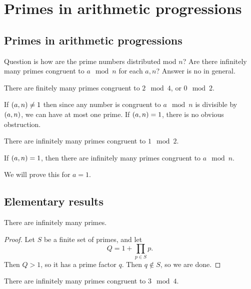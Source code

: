 \pagebreak

\section{Primes in arithmetic progressions}

\subsection{Primes in arithmetic progressions}

Question is how are the prime numbers distributed mod $ n $? Are there infinitely many primes congruent to $ a \mod n $ for each $ a, n $? Answer is no in general.

\begin{example*}
There are finitely many primes congruent to $ 2 \mod 4 $, or $ 0 \mod 2 $.
\end{example*}

If $ \left( a, n \right) \ne 1 $ then since any number is congruent to $ a \mod n $ is divisible by $ \left( a, n \right) $, we can have at most one prime. If $ \left( a, n \right) = 1 $, there is no obvious obstruction.

\begin{example*}
There are infinitely many primes congruent to $ 1 \mod 2 $.
\end{example*}

\begin{theorem}
If $ \left( a, n \right) = 1 $, then there are infinitely many primes congruent to $ a \mod n $.
\end{theorem}

We will prove this for $ a = 1 $.

\subsection{Elementary results}

\begin{theorem}
There are infinitely many primes.
\end{theorem}

\begin{proof}
Let $ S $ be a finite set of primes, and let
$$ Q = 1 + \prod_{p \in S} p. $$
Then $ Q > 1 $, so it has a prime factor $ q $. Then $ q \notin S $, so we are done.
\end{proof}

\begin{theorem}
There are infinitely many primes congruent to $ 3 \mod 4 $.
\end{theorem}


